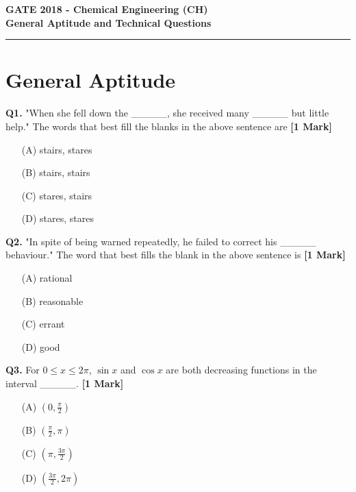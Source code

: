 \documentclass[11pt]{article}
\newcommand{\questiona}[2]{
    \noindent\textbf{Q#2.} #1 \hfill \textbf{[1 Mark]}
}
\begin{document}
\begin{center}
    \Large\textbf{GATE 2018 - Chemical Engineering (CH)} \\
    \large\textbf{General Aptitude and Technical Questions} \\
    \rule{\textwidth}{0.5pt} %
\end{center}

\vspace{0.5cm}

\section*{General Aptitude}

\questiona{"When she fell down the \_\_\_\_\_, she received many \_\_\_\_\_ but little help." The words that best fill the blanks in the above sentence are}{1}
\begin{enumerate}
    \item[(A)] stairs, stares  
    \item[(B)] stairs, stairs  
    \item[(C)] stares, stairs  
    \item[(D)] stares, stares  
\end{enumerate}

\questiona{"In spite of being warned repeatedly, he failed to correct his \_\_\_\_\_ behaviour." The word that best fills the blank in the above sentence is}{2}
\begin{enumerate}
    \item[(A)] rational  
    \item[(B)] reasonable  
    \item[(C)] errant  
    \item[(D)] good  
\end{enumerate}

\questiona{For \(0 \leq x \leq 2\pi\), \(\sin x\) and \(\cos x\) are both decreasing functions in the interval \_\_\_\_\_.}{3}
\begin{enumerate}
    \item[(A)] \(\left(0, \frac{\pi}{2}\right)\)  
    \item[(B)] \(\left(\frac{\pi}{2}, \pi\right)\)  
    \item[(C)] \(\left(\pi, \frac{3\pi}{2}\right)\)  
    \item[(D)] \(\left(\frac{3\pi}{2}, 2\pi\right)\)  
\end{enumerate}
\end{document}
